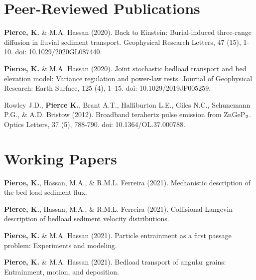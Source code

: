 \documentclass[11pt,letterpaper]{article}
\renewenvironment{itemize}{
	\begin{list}{}{
			\setlength{\leftmargin}{1.5em}
			\setlength{\rightmargin}{0em}  %
			\setlength{\itemsep}{0.25em}
			\setlength{\parskip}{0pt}
			\setlength{\parsep}{0.25em}
		}
	}{
	\end{list}
}
\renewenvironment{itemize}{
	\begin{list}{}{
			\setlength{\leftmargin}{1.5em}
			\setlength{\itemsep}{0.25em}
			\setlength{\parskip}{0pt}
			\setlength{\parsep}{0.25em}
		}
	}{
	\end{list}
}
\begin{document}
\section*{Peer-Reviewed Publications}
	
	\begin{itemize}
		\item[] \textbf{Pierce, K.} \& M.A. Hassan (2020). Back to Einstein: Burial-induced three-range diffusion in fluvial sediment transport. Geophysical Research Letters, 47 (15), 1-10. doi: 10.1029/2020GL087440.
		\item[] \textbf{Pierce, K.} \& M.A. Hassan (2020). Joint stochastic bedload transport and bed
		elevation model: Variance regulation and power-law rests. Journal of Geophysical Research: Earth Surface, 125 (4), 1–15. doi: 10.1029/2019JF005259.
		\item[] Rowley J.D., \textbf{Pierce K.}, Brant A.T., Halliburton L.E., Giles N.C., Schunemann P.G., \& A.D. Bristow (2012). Broadband terahertz pulse emission from ZnGeP$\textsubscript{2}$. Optics Letters, 37 (5),  788-790. doi: 10.1364/OL.37.000788.
	\end{itemize}


	
	\section*{Working Papers}
	
	\begin{itemize}
		\item[] \textbf{Pierce, K.}, Hassan, M.A., \& R.M.L. Ferreira (2021). Mechanistic description of the bed load sediment flux.
		\item[] \textbf{Pierce, K.}, Hassan, M.A., \& R.M.L. Ferreira (2021). Collisional Langevin description of bedload sediment velocity distributions.
		\item[] \textbf{Pierce, K.} \& M.A. Hassan (2021). Particle entrainment as a first passage problem: Experiments and modeling.
		\item[] \textbf{Pierce, K.} \& M.A. Hassan (2021). Bedload transport of angular grains: Entrainment, motion, and deposition.
	\end{itemize}
	
\end{document}
